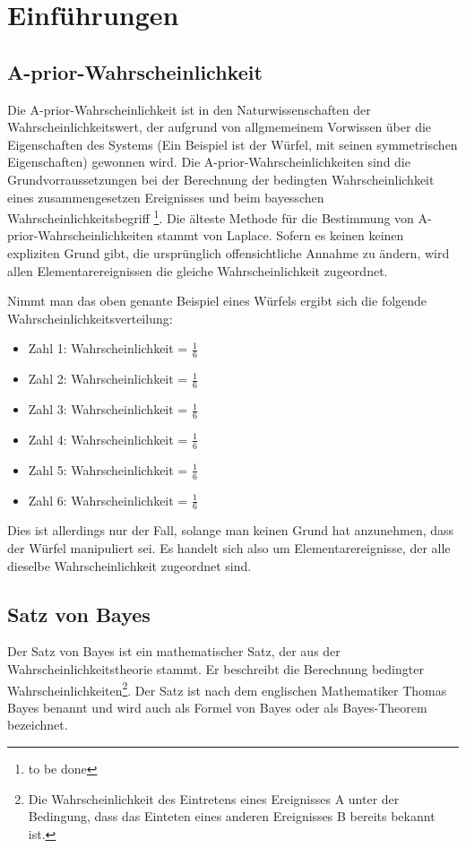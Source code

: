\chapter{Einführungen}

\section{A-prior-Wahrscheinlichkeit}

Die A-prior-Wahrscheinlichkeit ist in den Naturwissenschaften der Wahrscheinlichkeitswert, der aufgrund von allgmemeinem Vorwissen über die Eigenschaften des Systems
(Ein Beispiel ist der Würfel, mit seinen symmetrischen Eigenschaften) gewonnen wird. Die A-prior-Wahrscheinlichkeiten sind die Grundvorraussetzungen
bei der Berechnung der bedingten Wahrscheinlichkeit eines zusammengesetzen Ereignisses und beim bayesschen Wahrscheinlichkeitsbegriff \footnote{to be done}.
Die älteste Methode für die Bestimmung von A-prior-Wahrscheinlichkeiten stammt von Laplace. Sofern es keinen keinen expliziten Grund gibt, die ursprünglich
offensichtliche Annahme zu ändern, wird allen Elementarereignissen die gleiche Wahrscheinlichkeit zugeordnet. \cite[S. 80f]{Pap:1995}

Nimmt man das oben genante Beispiel eines Würfels ergibt sich die folgende Wahrscheinlichkeitsverteilung:

\begin{itemize} 
    \item Zahl 1: Wahrscheinlichkeit = $\frac{1}{6}$
    \item Zahl 2: Wahrscheinlichkeit = $\frac{1}{6}$
    \item Zahl 3: Wahrscheinlichkeit = $\frac{1}{6}$
    \item Zahl 4: Wahrscheinlichkeit = $\frac{1}{6}$
    \item Zahl 5: Wahrscheinlichkeit = $\frac{1}{6}$
    \item Zahl 6: Wahrscheinlichkeit = $\frac{1}{6}$
\end{itemize}

Dies ist allerdings nur der Fall, solange man keinen Grund hat anzunehmen, dass der Würfel manipuliert sei. Es handelt sich also um Elementarereignisse, der
alle dieselbe Wahrscheinlichkeit zugeordnet sind.

\section{Satz von Bayes}

Der Satz von Bayes ist ein mathematischer Satz, der aus der Wahrscheinlichkeitstheorie stammt. Er beschreibt die Berechnung bedingter 
Wahrscheinlichkeiten\footnote{Die Wahrscheinlichkeit des Eintretens eines Ereignisses A unter der Bedingung, dass das Einteten eines anderen Ereignisses B bereits bekannt ist.}.
Der Satz ist nach dem englischen Mathematiker Thomas Bayes benannt und wird auch als Formel von Bayes oder als Bayes-Theorem bezeichnet. \cite[S.411f]{Papulla:2014}

